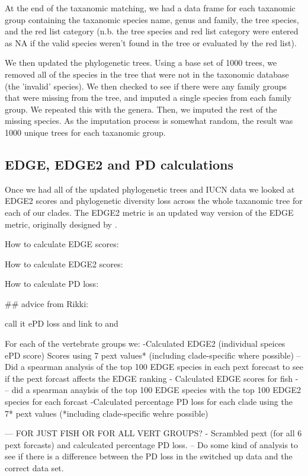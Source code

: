 \documentclass[11pt]{article}
\begin{document}
At the end of the taxanomic matching, we had a data frame for each taxanomic 
group containing the taxanomic species name, genus and family, the tree 
species, and the red list category (n.b. the tree species and red list category 
were entered as NA if the valid species weren't found in the tree or evaluated 
by the red list).

We then updated the phylogenetic trees. Using a base set of 1000 trees, we 
removed all of the species in the tree that were not in the taxonomic database 
(the 'invalid' species). We then checked to see if there were any family groups 
that were missing from the tree, and imputed a single species from each family 
group. We repeated this with the genera. Then, we imputed the rest of the 
missing species. As the imputation process is somewhat random, the result was 
1000 unique trees for each taxanomic group. 


\subsection{EDGE, EDGE2 and PD calculations}

Once we had all of the updated phylogenetic trees and IUCN data we looked at 
EDGE2 scores and phylogenetic diversity loss across the whole taxanomic tree 
for each of our clades. The EDGE2 metric is an updated way version of the EDGE 
metric, originally designed by \cite{Steel2007}.

How to calculate EDGE scores: 

How to calculate EDGE2 scores: 

How to calculate PD loss: 

## advice from Rikki: 	

call it ePD loss and link to \autocite{Faith2008} and \autocite{Steel2007}


For each of the vertebrate groups we:
-Calculated EDGE2 (individual speices ePD score) Scores using 7 pext values* 
(including clade-specific where 
possible)
-- Did a spearman analysis of the top 100 EDGE species in each pext forecast
to see if the  pext forcast affects the EDGE ranking
- Calculated EDGE scores for fish - 
-- did a spearman anaylsis of the top 100 EDGE species with the top 100 EDGE2 
species for each forcast
-Calculated percentage PD loss for each clade using the 7* pext values 
(*including clade-specific wehre possible)


--- FOR JUST FISH OR FOR ALL VERT GROUPS? 
- Scrambled pext (for all 6 pext forcasts) and calculcated percentage PD loss. 
-- Do some kind of analysis to see if there is a difference between the PD loss 
in the switched up data and the correct data set. 
\end{document}
